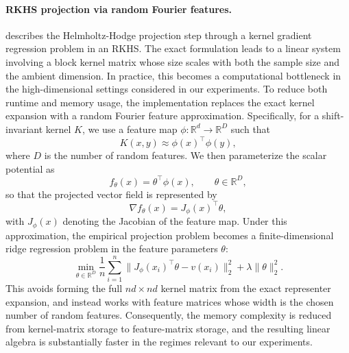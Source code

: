 \documentclass[11pt]{article}
\begin{document}
\paragraph{RKHS projection via random Fourier features.}
 describes the Helmholtz-Hodge projection step through a kernel gradient regression problem in an RKHS. The exact formulation leads to a linear system involving a block kernel matrix whose size scales with both the sample size and the ambient dimension. In practice, this becomes a computational bottleneck in the high-dimensional settings considered in our experiments. To reduce both runtime and memory usage, the implementation replaces the exact kernel expansion with a random Fourier feature approximation. Specifically, for a shift-invariant kernel \(K\), we use
a feature map $\phi:\mathbb{R}^d \to \mathbb{R}^D$
such that
\[
K(x,y) \approx \phi(x)^{\top} \phi(y),
\]
where \(D\) is the number of random features. We then parameterize the scalar potential as
\[
f_\theta(x) = \theta^{\top} \phi(x),
\qquad \theta \in \mathbb{R}^D,
\]
so that the projected vector field is represented by
\[
\nabla f_\theta(x)
=
J_\phi(x)^{\top} \theta,
\]
with \(J_\phi(x)\) denoting the Jacobian of the feature map. Under this approximation, the empirical projection problem becomes a finite-dimensional ridge
regression problem in the feature parameters \(\theta\):
\[
\min_{\theta \in \mathbb{R}^D}
\frac{1}{n}\sum_{i=1}^n
\bigl\|
J_\phi(x_i)^{\top} \theta - v(x_i)
\bigr\|_2^2
+
\lambda \|\theta\|_2^2.
\]
This avoids forming the full \(nd \times nd\) kernel matrix from the exact representer expansion,
and instead works with feature matrices whose width is the chosen number of random features.
Consequently, the memory complexity is reduced from kernel-matrix storage to feature-matrix
storage, and the resulting linear algebra is substantially faster in the regimes relevant to our
experiments.
\end{document}

